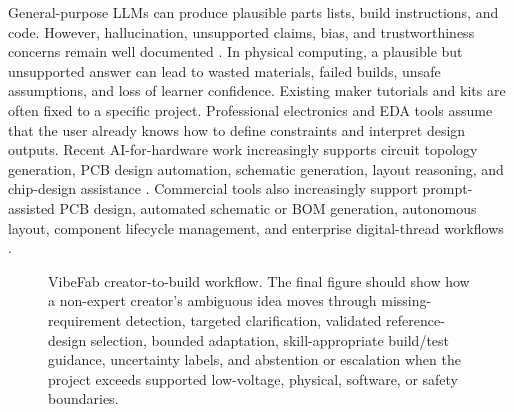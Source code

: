 General-purpose LLMs can produce plausible parts lists, build instructions, and code. However, hallucination, unsupported claims, bias, and trustworthiness concerns remain well documented \cite{ji2023hallucination,zhang2023sirens,liu2023trustworthyllms,lee2024llmbiaseducation}. In physical computing, a plausible but unsupported answer can lead to wasted materials, failed builds, unsafe assumptions, and loss of learner confidence. Existing maker tutorials and kits are often fixed to a specific project. Professional electronics and EDA tools assume that the user already knows how to define constraints and interpret design outputs. Recent AI-for-hardware work increasingly supports circuit topology generation, PCB design automation, schematic generation, layout reasoning, and chip-design assistance \cite{srinivasan2026pcbgenai,liu2023chipnemo,vijayaraghavan2024circuitsynth,zhang2024analogxpert,song2026pcbworld,hasan2026circuitlm,lu2026omnilayout,aldowaish2026sina}. Commercial tools also increasingly support prompt-assisted PCB design, automated schematic or BOM generation, autonomous layout, component lifecycle management, and enterprise digital-thread workflows \cite{flux2026copilot,circuitmind2025product,quilter2026product,altium2025activebom,cadence2025orcad,siemens2025xcelerator}. 

\begin{figure}[H]
\centering
{}
\caption{VibeFab creator-to-build workflow. The final figure should show how a non-expert creator's ambiguous idea moves through missing-requirement detection, targeted clarification, validated reference-design selection, bounded adaptation, skill-appropriate build/test guidance, uncertainty labels, and abstention or escalation when the project exceeds supported low-voltage, physical, software, or safety boundaries.}
\label{fig:creator_to_build_workflow}
\end{figure}

